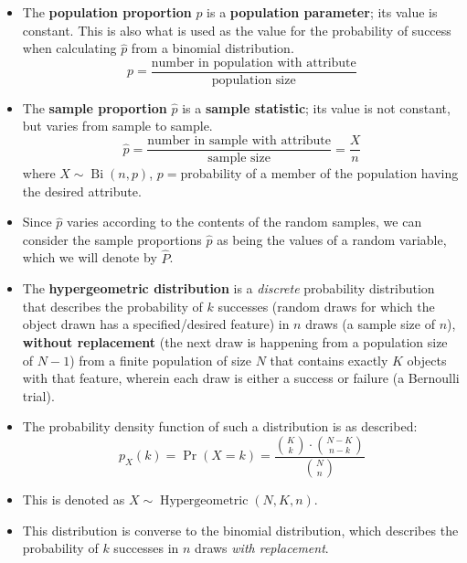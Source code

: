 \documentclass[12pt,a4paper,titlepage]{article}
\DeclareMathOperator{\Bi}{Bi}
\DeclareMathOperator{\Hypergeometric}{Hypergeometric}
\begin{document}
            \begin{SummaryBox}[title=Population and sample proportions]
                \begin{itemize}[leftmargin=*]
                    \item The \textbf{population proportion} $p$ is a \textbf{population parameter}; its value is constant. This is also what is used as the value for the probability of success when calculating $\hat{p}$ from a binomial distribution.
                    \[
                        p = \frac{\text{number in population with attribute}}{\text{population size}}
                    \]
                    \item The \textbf{sample proportion} $\hat{p}$ is a \textbf{sample statistic}; its value is not constant, but varies from sample to sample.
                    \[
                        \hat{p} = \frac{\text{number in sample with attribute}}{\text{sample size}} = \frac{X}{n}
                    \]
                    where $X \sim \Bi(n,p)$, $p={}$probability of a member of the population having the desired attribute.
                    \item Since $\hat{p}$ varies according to the contents of the random samples, we can consider the sample proportions $\hat{p}$ as being the values of a random variable, which we will denote by $\hat{P}$.
                \end{itemize}
            \end{SummaryBox}
            
            \begin{SummaryBox}[title=Hypergeometric distribution]
                \begin{itemize}
                    \item The \textbf{hypergeometric distribution} is a \textit{discrete} probability distribution that describes the probability of $k$ successes (random draws for which the object drawn has a specified/desired feature) in $n$ draws (a sample size of $n$), \textbf{without replacement} (the next draw is happening from a population size of $N-1$) from a finite population of size $N$ that contains exactly $K$ objects with that feature, wherein each draw is either a success or failure (a Bernoulli trial).
                    \item The probability density function of such a distribution is as described:
                    \[
                        p_X(k) = \Pr(X=k) = \frac{\binom{K}{k} \cdot \binom{N-K}{n-k}}{\binom{N}{n}}
                    \]
                    \item This is denoted as $X \sim \Hypergeometric(N,K,n)$.
                    \item This distribution is converse to the binomial distribution, which describes the probability of $k$ successes in $n$ draws \textit{with replacement}.
                \end{itemize}
            \end{SummaryBox}
            
\end{document}
